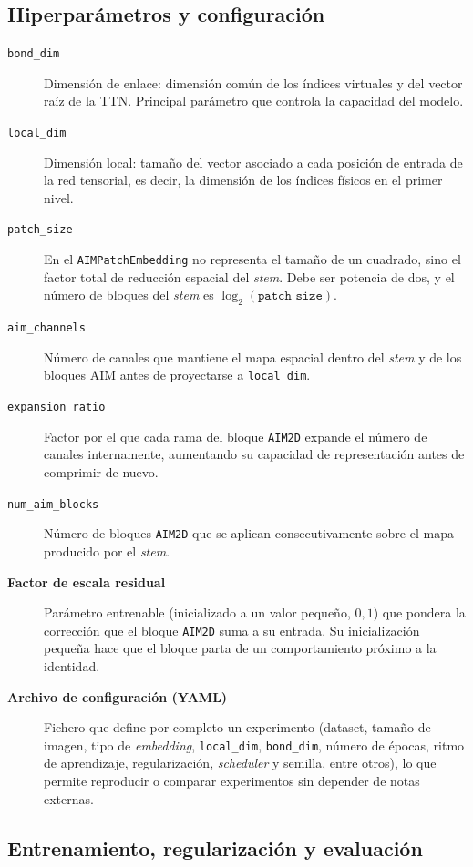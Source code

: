 \subsection*{Hiperparámetros y configuración}

\begin{description}
  \item[\texttt{bond\_dim}] Dimensión de enlace: dimensión común de los índices virtuales y del vector raíz de la TTN. Principal parámetro que controla la capacidad del modelo.
  \item[\texttt{local\_dim}] Dimensión local: tamaño del vector asociado a cada posición de entrada de la red tensorial, es decir, la dimensión de los índices físicos en el primer nivel.
  \item[\texttt{patch\_size}] En el \texttt{AIMPatchEmbedding} no representa el tamaño de un cuadrado, sino el factor total de reducción espacial del \textit{stem}. Debe ser potencia de dos, y el número de bloques del \textit{stem} es $\log_2(\texttt{patch\_size})$.
  \item[\texttt{aim\_channels}] Número de canales que mantiene el mapa espacial dentro del \textit{stem} y de los bloques AIM antes de proyectarse a \texttt{local\_dim}.
  \item[\texttt{expansion\_ratio}] Factor por el que cada rama del bloque \texttt{AIM2D} expande el número de canales internamente, aumentando su capacidad de representación antes de comprimir de nuevo.
  \item[\texttt{num\_aim\_blocks}] Número de bloques \texttt{AIM2D} que se aplican consecutivamente sobre el mapa producido por el \textit{stem}.
  \item[\textbf{Factor de escala residual}] Parámetro entrenable (inicializado a un valor pequeño, $0{,}1$) que pondera la corrección que el bloque \texttt{AIM2D} suma a su entrada. Su inicialización pequeña hace que el bloque parta de un comportamiento próximo a la identidad.
  \item[\textbf{Archivo de configuración (YAML)}] Fichero que define por completo un experimento (dataset, tamaño de imagen, tipo de \textit{embedding}, \texttt{local\_dim}, \texttt{bond\_dim}, número de épocas, ritmo de aprendizaje, regularización, \textit{scheduler} y semilla, entre otros), lo que permite reproducir o comparar experimentos sin depender de notas externas.
\end{description}

\subsection*{Entrenamiento, regularización y evaluación}

